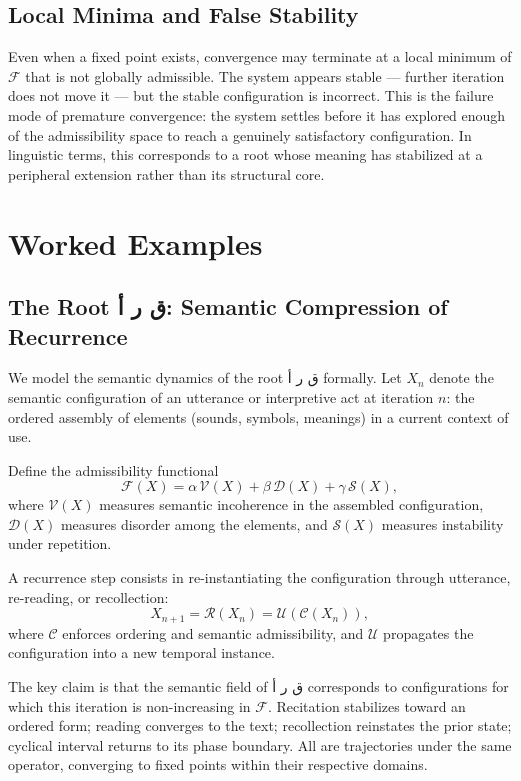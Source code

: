 \documentclass[12pt, oneside]{article}
\newcommand{\AR}[1]{\textarabic{#1}}
\theoremstyle{definition}
\theoremstyle{remark}
\begin{document}
\subsection{Local Minima and False Stability}

Even when a fixed point exists, convergence may terminate at a local minimum of $\mathcal{F}$ that is not globally admissible.
The system appears stable --- further iteration does not move it --- but the stable configuration is incorrect.
This is the failure mode of premature convergence: the system settles before it has explored enough of the admissibility space to reach a genuinely satisfactory configuration.
In linguistic terms, this corresponds to a root whose meaning has stabilized at a peripheral extension rather than its structural core.

\section{Worked Examples}

\subsection{The Root \AR{ق ر أ}: Semantic Compression of Recurrence}

We model the semantic dynamics of the root \AR{ق ر أ} formally.
Let $X_{n}$ denote the semantic configuration of an utterance or interpretive act at iteration $n$: the ordered assembly of elements (sounds, symbols, meanings) in a current context of use.

Define the admissibility functional
\[
\mathcal{F}(X) = \alpha\, \mathcal{V}(X) + \beta\, \mathcal{D}(X) + \gamma\, \mathcal{S}(X),
\]
where $\mathcal{V}(X)$ measures semantic incoherence in the assembled configuration, $\mathcal{D}(X)$ measures disorder among the elements, and $\mathcal{S}(X)$ measures instability under repetition.

A recurrence step consists in re-instantiating the configuration through utterance, re-reading, or recollection:
\[
X_{n+1} = \mathcal{R}(X_{n}) = \mathcal{U}(\mathcal{C}(X_{n})),
\]
where $\mathcal{C}$ enforces ordering and semantic admissibility, and $\mathcal{U}$ propagates the configuration into a new temporal instance.

The key claim is that the semantic field of \AR{ق ر أ} corresponds to configurations for which this iteration is non-increasing in $\mathcal{F}$.
Recitation stabilizes toward an ordered form; reading converges to the text; recollection reinstates the prior state; cyclical interval returns to its phase boundary.
All are trajectories under the same operator, converging to fixed points within their respective domains.
\end{document}
